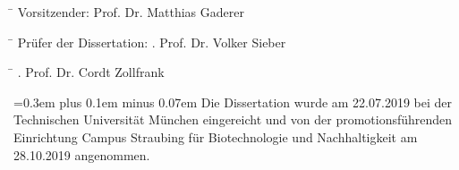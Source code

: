 \begin{titlepage}
	\noindent
	\begin{tabbing}
		\hspace{4.9cm} \= \kill
		Vorsitzender: \> Prof. Dr. Matthias Gaderer \\
	\end{tabbing}
	\vspace{-9.6mm}
	\begin{tabbing}
		\hspace{4.9cm} \= \kill
		Prüfer der Dissertation: . Prof. Dr. Volker Sieber \\
	\end{tabbing}
	\vspace{-11.2mm}
	\begin{tabbing}
		\hspace{4.9cm} \= \kill
		. Prof. Dr. Cordt Zollfrank \\
	\end{tabbing}%
\vspace{9.7mm}%
\noindent%
\spaceskip=0.3em plus 0.1em minus 0.07em%
\fontsize{11pt}{16.9pt}%
\selectfont%
Die Dissertation wurde am 22.07.2019 bei der Technischen Universität München eingereicht und von der promotionsführenden Einrichtung Campus Straubing für Biotechnologie und \mbox{Nachhaltigkeit} am 28.10.2019 angenommen.
\afterpage{\restoregeometry}
\end{titlepage}

